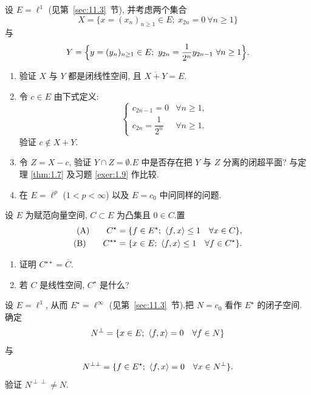 \begin{exercise}
\label{exer:1.14}
设 $E=\ell^1$ (见第~\ref{sec:11.3}~节), 并考虑两个集合
\begin{equation*}
X=\{x=(x_n)_{n\ge1}\in E;\ x_{2n}=0\ \forall n\ge1\}
\end{equation*}
与
\begin{equation*}
Y=\Bigl\{y=(y_n)_{n\ge1}\in E;\ y_{2n}=\frac{1}{2^n}y_{2n-1}\ \forall n\ge1\Bigr\}.
\end{equation*}

\begin{enumerate}[label=\arabic*., leftmargin=2.2em, itemsep=0.25em]
	\item 验证 $X$ 与 $Y$ 都是闭线性空间, 且 $\overline{X+Y}=E$.
	\item 令 $c\in E$ 由下式定义:
	      \begin{equation*}
	      \begin{cases}
	      	c_{2n-1}=0 & \forall n\ge1,\\[0.2em]
	      	c_{2n}=\dfrac{1}{2^n} & \forall n\ge1.
	      \end{cases}
	      \end{equation*}
	      验证 $c\notin X+Y$.
	\item 令 $Z=X-c$, 验证 $Y\cap Z=\emptyset$.$E$ 中是否存在把 $Y$ 与 $Z$ 分离的闭超平面?
	      与定理  \ref{thm:1.7} 及习题  \ref{exer:1.9} 作比较.
	\item 在 $E=\ell^p$ ($1<p<\infty$) 以及 $E=c_0$ 中问同样的问题.
\end{enumerate}
\end{exercise}

\begin{exercise}
\label{exer:1.15}
设 $E$ 为赋范向量空间, $C\subset E$ 为凸集且 $0\in C$.置
\begin{align*}
\text{(A)}\qquad C^\star&=\{f\in E^\star;\ \left\langle f,x\right\rangle\le1\quad \forall x\in C\},\\
\text{(B)}\qquad C^{\star\star}&=\{x\in E;\ \left\langle f,x\right\rangle\le1\quad \forall f\in C^\star\}.
\end{align*}

\begin{enumerate}[label=\arabic*., leftmargin=2.2em, itemsep=0.25em]
	\item 证明 $C^{\star\star}=\overline{C}$.
	\item 若 $C$ 是线性空间, $C^\star$ 是什么?
\end{enumerate}
\end{exercise}

\begin{exercise}
\label{exer:1.16}
设 $E=\ell^1$, 从而 $E^\star=\ell^\infty$ (见第~\ref{sec:11.3}~节).把 $N=c_0$ 看作 $E^\star$ 的闭子空间.
确定
\begin{equation*}
N^\perp=\{x\in E;\ \dual{f}{x}=0\quad \forall f\in N\}
\end{equation*}
与
\begin{equation*}
N^{\perp\perp}=\{f\in E^\star;\ \dual{f}{x}=0\quad \forall x\in N^\perp\}.
\end{equation*}
验证 $N^{\perp\perp}\ne N$.
\end{exercise}

